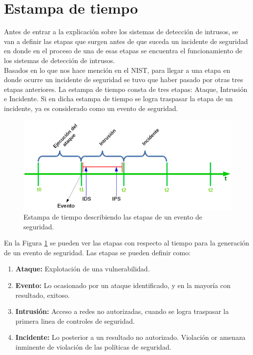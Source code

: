 \section{Estampa de tiempo}

Antes de entrar a la explicación sobre los sistemas de detección de intrusos, se van a definir las etapas que surgen antes de que suceda un incidente de seguridad en donde en el proceso de una de esas etapas se encuentra el funcionamiento de los sistemas de detección de intrusos.\\

Basados en lo que nos hace mención en el NIST, para llegar a una etapa en donde ocurre un incidente de seguridad se tuvo que haber pasado por otras tres etapas anteriores. La estampa de tiempo consta de tres etapas: Ataque, Intrusión e Incidente. Si en dicha estampa de tiempo se logra traspasar la etapa de un incidente, ya es considerado como un evento de seguridad.\\ 

\begin{figure}
	\centering
	\includegraphics[scale=.4]{images/time_stamp}
	\caption{Estampa de tiempo describiendo las etapas de un evento de seguridad.}
	\label{fig:time_stamp}
\end{figure}

En la Figura \ref{fig:time_stamp} se pueden ver las etapas con respecto al tiempo para la generación de un evento de seguridad. Las etapas se pueden definir como:\\
\begin{enumerate}
	\item \textbf{Ataque:} Explotación de una vulnerabilidad.
	\item \textbf{Evento:} Lo ocasionado por un ataque identificado, y en la mayoría con resultado, exitoso.
	\item \textbf{Intrusión:} Acceso a redes no autorizadas, cuando se logra traspasar la primera linea de controles de seguridad.
	\item \textbf{Incidente:} Lo posterior a un resultado no autorizado. Violación or amenaza inminente de violación de las políticas de seguridad.
\end{enumerate}


